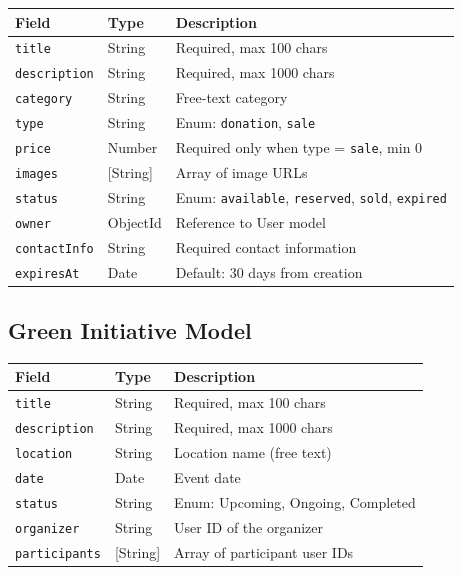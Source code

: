 \documentclass[12pt,a4paper]{article}
\begin{document}
\begin{longtable}{@{}llp{5.5cm}@{}}
\toprule
\textbf{Field} & \textbf{Type} & \textbf{Description} \\
\midrule
\endhead
\texttt{title}       & String   & Required, max 100 chars \\
\texttt{description} & String   & Required, max 1000 chars \\
\texttt{category}    & String   & Free-text category \\
\texttt{type}        & String   & Enum: \texttt{donation}, \texttt{sale} \\
\texttt{price}       & Number   & Required only when type = \texttt{sale}, min 0 \\
\texttt{images}      & [String] & Array of image URLs \\
\texttt{status}      & String   & Enum: \texttt{available}, \texttt{reserved}, \texttt{sold}, \texttt{expired} \\
\texttt{owner}       & ObjectId & Reference to User model \\
\texttt{contactInfo} & String   & Required contact information \\
\texttt{expiresAt}   & Date     & Default: 30 days from creation \\
\bottomrule
\end{longtable}

\subsection{Green Initiative Model}

\begin{longtable}{@{}llp{5.5cm}@{}}
\toprule
\textbf{Field} & \textbf{Type} & \textbf{Description} \\
\midrule
\endhead
\texttt{title}        & String   & Required, max 100 chars \\
\texttt{description}  & String   & Required, max 1000 chars \\
\texttt{location}     & String   & Location name (free text) \\
\texttt{date}         & Date     & Event date \\
\texttt{status}       & String   & Enum: Upcoming, Ongoing, Completed \\
\texttt{organizer}    & String   & User ID of the organizer \\
\texttt{participants} & [String] & Array of participant user IDs \\
\bottomrule
\end{longtable}
\end{document}
